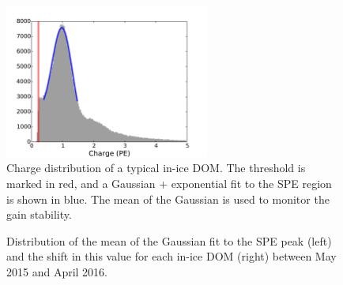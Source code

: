 \begin{figure}[!h]
 \centering
 \includegraphics[width=0.6\textwidth]{graphics/dom/reliability/chargedist.pdf}
 \caption{Charge distribution of a typical in-ice DOM. The threshold
   is marked in red, and a Gaussian + exponential fit to
   the SPE region is shown in blue. The mean of the Gaussian is used
   to monitor the gain stability.}
 \label{fig:spe_fit_thresh}
\end{figure}

\begin{figure}[!h]
  \captionsetup[subfigure]{labelformat=empty}
  \centering
  \caption{Distribution of the mean of the Gaussian fit to the SPE
    peak (left) and the shift in this value for each in-ice DOM (right) between May 2015 and April
   2016.}
  \label{fig:gain_spe_stability}
\end{figure} 

